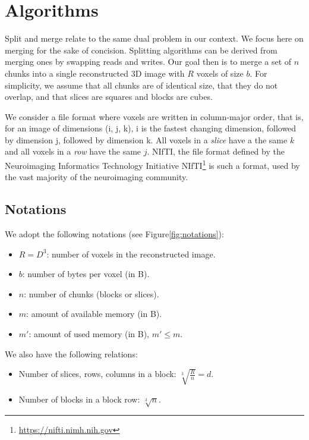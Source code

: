 \documentclass[10pt, conference, compsocconf]{IEEEtran}
\begin{document}

\section{Algorithms}
\label{sec:algos}

Split and merge relate to the same dual problem in our context. We
focus here on merging for the sake of concision. Splitting algorithms
can be derived from merging ones by swapping reads and writes. Our
goal then is to merge a set of $n$ chunks into a single reconstructed
3D image with $R$ voxels of size $b$. For simplicity, we assume that
all chunks are of identical size, that they do not overlap, and that
slices are squares and blocks are cubes.

We consider a file format where voxels are written in column-major
order, that is, for an image of dimensions (i, j, k), i is the fastest
changing dimension, followed by dimension j, followed by dimension
k. All voxels in a \emph{slice} have a the same $k$ and all voxels in
a \emph{row} have the same $j$.  NIfTI, the file format defined by the
Neuroimaging Informatics Technology Initiative
NIfTI\footnote{\url{https://nifti.nimh.nih.gov}} is such a format,
used by the vast majority of the neuroimaging community.

\subsection{Notations}

We adopt the following notations (see Figure\ref{fig:notations}):
\begin{itemize}
\item $R=D^3$: number of voxels in the reconstructed image.
\item $b$: number of bytes per voxel (in B).
\item $n$: number of chunks (blocks or slices).
\item $m$: amount of available memory (in B).
\item $m'$: amount of used memory (in B), $m'\leq m$.
\end{itemize}
We also have the following relations:
\begin{itemize}
\item Number of slices, rows, columns in a block: $\sqrt[3]{\frac{R}{n}}=d$.
\item Number of blocks in a block row: $\sqrt[3]{n}$.
\end{itemize}
\end{document}
